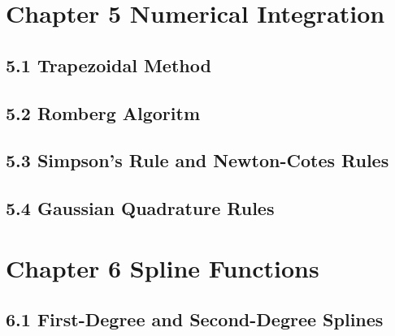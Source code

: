 \documentclass{article}
\theoremstyle{remark}
\begin{document}
\section{Chapter 5 Numerical Integration} 

\subsection{5.1 Trapezoidal Method}


\subsection{5.2 Romberg Algoritm }


\subsection{5.3 Simpson's Rule and Newton-Cotes Rules }


\subsection{5.4 Gaussian Quadrature Rules }


\section{Chapter 6 Spline Functions} 

\subsection{6.1 First-Degree and Second-Degree Splines}
\end{document}
